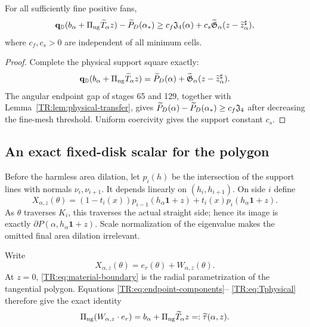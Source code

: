 \begin{theorem}
\label{TR:thm:physical-D0}
For all sufficiently fine positive fans,
\begin{equation}\label{TR:eq:physical-D0}
 \mathbf q_{\mathbb D}(b_\alpha+\Pi_{\rm ng}\widetilde T_\alpha z)
 -\widetilde P_D(\alpha_*)
 \ge c_f\mathfrak J_4(\alpha)
   +c_s\widetilde{\mathfrak G}_\alpha(z-\widetilde z_\alpha^\sharp),
\end{equation}
where $c_f,c_s>0$ are independent of all minimum cells.
\end{theorem}

\begin{proof}
Complete the physical support square exactly:
\begin{equation*}
 \mathbf q_{\mathbb D}(b_\alpha+\Pi_{\rm ng}\widetilde T_\alpha z)
 =\widetilde P_D(\alpha)
  +\widetilde{\mathfrak G}_\alpha(z-\widetilde z_\alpha^\sharp).
\end{equation*}
The angular endpoint gap of stages 65 and 129, together with
Lemma~\ref{TR:lem:physical-transfer}, gives
$\widetilde P_D(\alpha)-\widetilde P_D(\alpha_*)\ge c_f\mathfrak J_4$ after
decreasing the fine-mesh threshold.  Uniform coercivity gives the support
constant $c_s$.
\end{proof}

\subsection{An exact fixed-disk scalar for the polygon}

Before the harmless area dilation, let $p_i(h)$ be the intersection of
the support lines with normals $\nu_i,\nu_{i+1}$.  It depends linearly on
$(h_i,h_{i+1})$.  On side $i$ define
\begin{equation}\label{TR:eq:material-boundary}
 X_{\alpha,z}(\theta)
 =(1-t_i(x))p_{i-1}(h_\alpha\mathbf1+z)
  +t_i(x)p_i(h_\alpha\mathbf1+z).
\end{equation}
As $\theta$ traverses $K_i$, this traverses the actual straight side;
hence its image is exactly $\partial P(\alpha,h_\alpha\mathbf1+z)$.
Scale normalization of the eigenvalue makes the omitted final area
dilation irrelevant.

Write
\begin{equation}\label{TR:eq:W}
 X_{\alpha,z}(\theta)=e_r(\theta)+W_{\alpha,z}(\theta).
\end{equation}
At $z=0$, \eqref{TR:eq:material-boundary} is the radial parametrization of the
tangential polygon.  Equations \eqref{TR:eq:endpoint-components}--
\eqref{TR:eq:Tphysical} therefore give the exact identity
\begin{equation}\label{TR:eq:normal-W}
 \Pi_{\rm ng}(W_{\alpha,z}\cdot e_r)
 =b_\alpha+\Pi_{\rm ng}\widetilde T_\alpha z
 =:\widetilde\tau(\alpha,z).
\end{equation}

